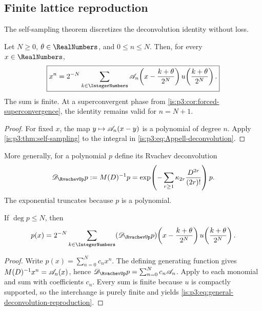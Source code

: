 \subsection{Finite lattice reproduction}

The self-sampling theorem discretizes the deconvolution identity without loss.

\begin{theorem}
\label{is:p3:thm:Appell-lattice-reproduction}
Let $N\ge0$, $\theta\in\RealNumbers$, and $0\le n\le N$.  Then, for every $x\in\RealNumbers$,
\begin{equation}
 \boxed{\displaystyle
 x^n=2^{-N}\sum_{k\in\IntegerNumbers}
 \Acal_n\!\left(x-\frac{k+\theta}{2^N}\right)
 u\!\left(\frac{k+\theta}{2^N}\right).}
 \label{is:p3:eq:Appell-lattice-reproduction}
\end{equation}
The sum is finite.  At a superconvergent phase from \cref{is:p3:cor:forced-superconvergence}, the identity remains valid for $n=N+1$.
\end{theorem}

\begin{proof}
For fixed $x$, the map $y\mapsto\mathscr A_n(x-y)$ is a polynomial of degree $n$.  Apply \cref{is:p3:thm:self-sampling} to the integral in \eqref{is:p3:eq:Appell-deconvolution}.
\end{proof}

More generally, for a polynomial $p$ define its Rvachev deconvolution
\begin{equation}
 \mathscr D_{\RvachevUp}p
 :=M(D)^{-1}p
 =\exp\!\left(-\sum_{r\ge1}\kappa_{2r}
 \frac{D^{2r}}{(2r)!}\right)p.
 \label{is:p3:eq:polynomial-deconvolution}
\end{equation}
The exponential truncates because $p$ is a polynomial.

\begin{corollary}
\label{is:p3:cor:polynomial-deconvolution}
If $\deg p\le N$, then
\begin{equation}
 p(x)=2^{-N}\sum_{k\in\IntegerNumbers}
 (\mathscr D_{\RvachevUp}p)\!\left(x-\frac{k+\theta}{2^N}\right)
 u\!\left(\frac{k+\theta}{2^N}\right).
 \label{is:p3:eq:general-deconvolution-reproduction}
\end{equation}
\end{corollary}

\begin{proof}
Write $p(x)=\sum_{n=0}^{N}c_nx^n$.  The defining generating function gives
$M(D)^{-1}x^n=\mathscr A_n(x)$, hence
$\mathscr D_{\RvachevUp}p=\sum_{n=0}^{N}c_n\Acal_n$.  Apply
 to each monomial and sum with
coefficients $c_n$.  Every sum is finite because $u$ is compactly supported,
so the interchange is purely finite and yields
\eqref{is:p3:eq:general-deconvolution-reproduction}.
\end{proof}

